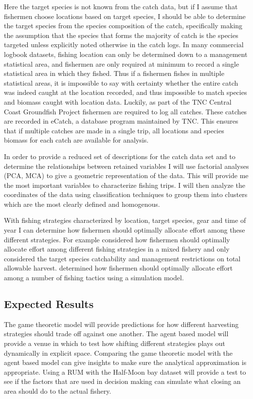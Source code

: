 \documentclass[12pt,a4paper]{report}
\begin{document}
Here the target species is not known from the catch data, but if I assume that fishermen choose locations based on target species, I should be able to determine the target species from the species composition of the catch, specifically making the assumption that the species that forms the majority of catch is the species targeted unless explicitly noted otherwise in the catch logs. In many commercial logbook datasets, fishing location can only be determined down to a management statistical area, and fishermen are only required at minimum to record a single statistical area in which they fished. Thus if a fishermen fishes in multiple statistical areas, it is impossible to say with certainty whether the entire catch was indeed caught at the location recorded, and thus impossible to match species and biomass caught with location data. Luckily, as part of the TNC Central Coast Groundfish Project fishermen are required to log all catches. These catches are recorded in eCatch, a database program maintained by TNC. This ensures that if multiple catches are made in a single trip, all locations and species biomass for each catch are available for analysis. 

In order to provide a reduced set of descriptions for the catch data set and to determine the relationships between retained variables I will use factorial analyses (PCA, MCA) to give a geometric representation of the data. This will provide me the most important variables to characterize fishing trips. I will then analyze the coordinates of the data using classification techniques to group them into clusters which are the most clearly defined and homogenous. 

With fishing strategies characterized by location, target species, gear and time of year I can determine how fishermen should optimally allocate effort among these different strategies. For example \cite{MurawskiFinn:1986} considered how fishermen should optimally allocate effort among different fishing strategies in a mixed fishery and only considered the target species catchability and management restrictions on total allowable harvest. \cite{MarchalHorwood:1996} determined how fishermen should optimally allocate effort among a number of fishing tactics using a simulation model. 

\subsection{Expected Results}
The game theoretic model will provide predictions for how different harvesting strategies should trade off against one another. The agent based model will provide a venue in which to test how shifting different strategies plays out dynamically in explicit space. Comparing the game theoretic model with the agent based model can give insights to make sure the analytical approximation is appropriate. Using a RUM with the Half-Moon bay dataset will provide a test to see if the factors that are used in decision making can simulate what closing an area should do to the actual fishery. 
\end{document}
